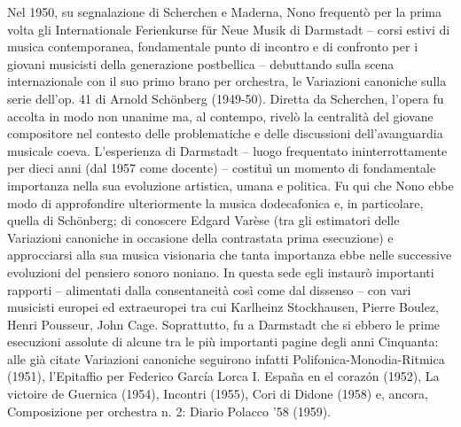 Nel 1950, su segnalazione di Scherchen e Maderna, Nono frequentò per la prima volta gli Internationale Ferienkurse für Neue Musik di Darmstadt – corsi estivi di musica contemporanea, fondamentale punto di incontro e di confronto per i giovani musicisti della generazione postbellica – debuttando sulla scena internazionale con il suo primo brano per orchestra, le Variazioni canoniche sulla serie dell’op. 41 di Arnold Schönberg (1949-50). Diretta da Scherchen, l’opera fu accolta in modo non unanime ma, al contempo, rivelò la centralità del giovane compositore nel contesto delle problematiche e delle discussioni dell’avanguardia musicale coeva. L’esperienza di Darmstadt – luogo frequentato ininterrottamente per dieci anni (dal 1957 come docente) – costituì un momento di fondamentale importanza nella sua evoluzione artistica, umana e politica. Fu qui che Nono ebbe modo di approfondire ulteriormente la musica dodecafonica e, in particolare, quella di Schönberg; di conoscere Edgard Varèse (tra gli estimatori delle Variazioni canoniche in occasione della contrastata prima esecuzione) e approcciarsi alla sua musica visionaria che tanta importanza ebbe nelle successive evoluzioni del pensiero sonoro noniano. In questa sede egli instaurò importanti rapporti – alimentati dalla consentaneità così come dal dissenso – con vari musicisti europei ed extraeuropei tra cui Karlheinz Stockhausen, Pierre Boulez, Henri Pousseur, John Cage. Soprattutto, fu a Darmstadt che si ebbero le prime esecuzioni assolute di alcune tra le più importanti pagine degli anni Cinquanta: alle già citate Variazioni canoniche seguirono infatti Polifonica-Monodia-Ritmica (1951), l’Epitaffio per Federico García Lorca I. España en el corazón (1952), La victoire de Guernica (1954), Incontri (1955), Cori di Didone (1958) e, ancora, Composizione per orchestra n. 2: Diario Polacco ’58 (1959).

